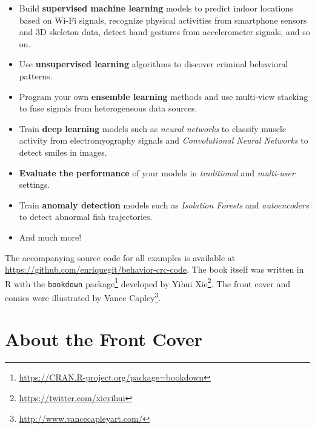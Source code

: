\documentclass[
  11pt,
]{krantz}
\providecommand{\tightlist}{%
  \setlength{\itemsep}{0pt}\setlength{\parskip}{0pt}}
\renewcommand{\href}[2]{#2\footnote{\url{#1}}}
\begin{document}
\begin{itemize}
\tightlist
\item
  Build \textbf{supervised machine learning} models to predict indoor locations based on Wi-Fi signals, recognize physical activities from smartphone sensors and 3D skeleton data, detect hand gestures from accelerometer signals, and so on.
\item
  Use \textbf{unsupervised learning} algorithms to discover criminal behavioral patterns.
\item
  Program your own \textbf{ensemble learning} methods and use multi-view stacking to fuse signals from heterogeneous data sources.
\item
  Train \textbf{deep learning} models such as \emph{neural networks} to classify muscle activity from electromyography signals and \emph{Convolutional Neural Networks} to detect smiles in images.
\item
  \textbf{Evaluate the performance} of your models in \emph{traditional} and \emph{multi-user} settings.
\item
  Train \textbf{anomaly detection} models such as \emph{Isolation Forests} and \emph{autoencoders} to detect abnormal fish trajectories.
\item
  And much more!
\end{itemize}

The accompanying source code for all examples is available at \url{https://github.com/enriquegit/behavior-crc-code}. The book itself was written in R with the \texttt{bookdown} package\footnote{\url{https://CRAN.R-project.org/package=bookdown}} developed by \href{https://twitter.com/xieyihui}{Yihui Xie}. The front cover and comics were illustrated by \href{http://www.vancecapleyart.com/}{Vance Capley}.

\hypertarget{about-the-front-cover}{%
\section*{About the Front Cover}\label{about-the-front-cover}}
\end{document}
